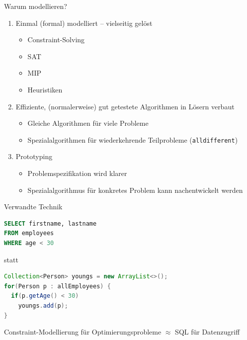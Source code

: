 \begin{frame}{Warum modellieren?}
\begin{enumerate}
\item Einmal (formal) modelliert -- vielseitig gelöst
\begin{itemize}
\item Constraint-Solving
\item SAT
\item MIP 
\item Heuristiken
\end{itemize}
\vspace*{1ex}
\item Effiziente, (normalerweise) gut getestete Algorithmen in Lösern verbaut
\begin{itemize}
\item Gleiche Algorithmen für viele Probleme
\item Spezialalgorithmen für wiederkehrende Teilprobleme (\texttt{alldifferent})
\end{itemize}
\vspace*{1ex}
\item Prototyping
\begin{itemize}
\item Problemspezifikation wird klarer
\item Spezialalgorithmus für konkretes Problem kann nachentwickelt werden
\end{itemize}

\end{enumerate}
\end{frame}

\begin{frame}[fragile]{Verwandte Technik}
\begin{lstlisting}[language=sql]
SELECT firstname, lastname
FROM employees 
WHERE age < 30
\end{lstlisting}
\vspace*{1ex}
statt 
\vspace*{1ex}
\begin{lstlisting}[language=java]
Collection<Person> youngs = new ArrayList<>();
for(Person p : allEmployees) {
  if(p.getAge() < 30)
    youngs.add(p);
}
\end{lstlisting}

\begin{parchment}[Motivation]
\centering 
\alert{Constraint-Modellierung für Optimierungsprobleme $\approx$ SQL für Datenzugriff} 
\end{parchment}

\end{frame}

